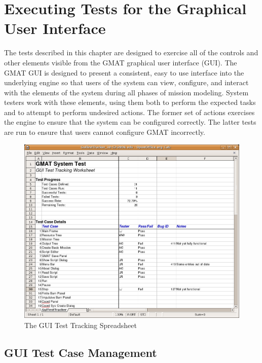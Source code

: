 \chapter{\label{chap:guitests}Executing Tests for the Graphical User Interface}

The tests described in this chapter are designed to exercise all of the controls and other elements
visible from the GMAT graphical user interface (GUI).  The GMAT GUI is designed to present a
consistent, easy to use interface into the underlying engine so that users of the system can view,
configure, and interact with the elements of the system during all phases of mission modeling.
System testers work with these elements, using them both to perform the expected tasks and to
attempt to perform undesired actions.  The former set of actions exercises the engine to ensure
that the system can be configured correctly.  The latter tests are run to ensure that users cannot
configure GMAT incorrectly.

\begin{figure}[htb]
\begin{center}
\includegraphics[460,372]{Images/GuiTestTracker.png}
\caption{\label{figure:GuiTestTracker}The GUI Test Tracking Spreadsheet}
\end{center}
\end{figure}

\section{GUI Test Case Management}


